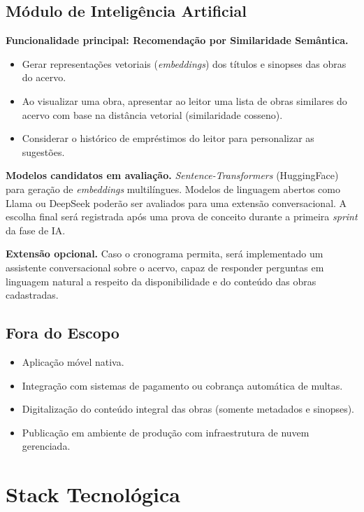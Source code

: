 \subsection{Módulo de Inteligência Artificial}

\noindent\textbf{Funcionalidade principal: Recomendação por Similaridade Semântica.}

\begin{itemize}
    \item Gerar representações vetoriais (\textit{embeddings}) dos títulos e sinopses das obras do acervo.
    \item Ao visualizar uma obra, apresentar ao leitor uma lista de obras similares do acervo com base na distância vetorial (similaridade cosseno).
    \item Considerar o histórico de empréstimos do leitor para personalizar as sugestões.
\end{itemize}

\noindent\textbf{Modelos candidatos em avaliação.} \textit{Sentence-Transformers} (HuggingFace) para geração de \textit{embeddings} multilíngues. Modelos de linguagem abertos como Llama ou DeepSeek poderão ser avaliados para uma extensão conversacional. A escolha final será registrada após uma prova de conceito durante a primeira \textit{sprint} da fase de IA.

\noindent\textbf{Extensão opcional.} Caso o cronograma permita, será implementado um assistente conversacional sobre o acervo, capaz de responder perguntas em linguagem natural a respeito da disponibilidade e do conteúdo das obras cadastradas.

\subsection{Fora do Escopo}

\begin{itemize}
    \item Aplicação móvel nativa.
    \item Integração com sistemas de pagamento ou cobrança automática de multas.
    \item Digitalização do conteúdo integral das obras (somente metadados e sinopses).
    \item Publicação em ambiente de produção com infraestrutura de nuvem gerenciada.
\end{itemize}

\section{Stack Tecnológica}

